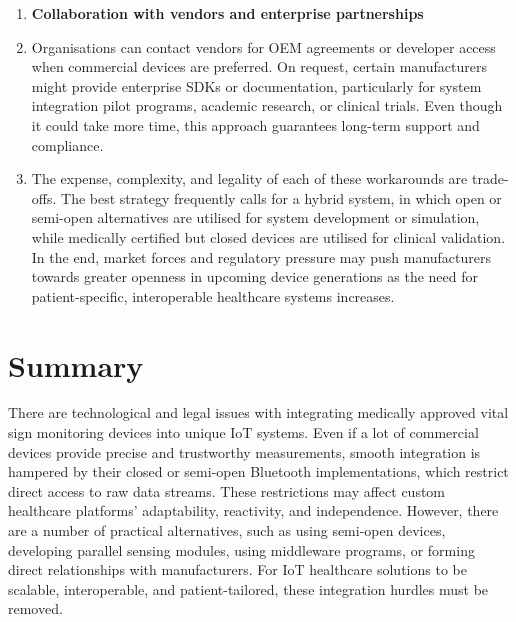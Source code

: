 \begin{enumerate}
	\item \textbf{Collaboration with vendors and enterprise partnerships}
	\item [] Organisations can contact vendors for OEM agreements or developer access when commercial devices are preferred. On request, certain manufacturers might provide enterprise SDKs or documentation, particularly for system integration pilot programs, academic research, or clinical trials. Even though it could take more time, this approach guarantees long-term support and compliance.
	\item[] The expense, complexity, and legality of each of these workarounds are trade-offs. The best strategy frequently calls for a hybrid system, in which open or semi-open alternatives are utilised for system development or simulation, while medically certified but closed devices are utilised for clinical validation. In the end, market forces and regulatory pressure may push manufacturers towards greater openness in upcoming device generations as the need for patient-specific, interoperable healthcare systems increases.
\end{enumerate}

\section{Summary} %
There are technological and legal issues with integrating medically approved vital sign monitoring devices into unique IoT systems. Even if a lot of commercial devices provide precise and trustworthy measurements, smooth integration is hampered by their closed or semi-open Bluetooth implementations, which restrict direct access to raw data streams. These restrictions may affect custom healthcare platforms' adaptability, reactivity, and independence. However, there are a number of practical alternatives, such as using semi-open devices, developing parallel sensing modules, using middleware programs, or forming direct relationships with manufacturers. For IoT healthcare solutions to be scalable, interoperable, and patient-tailored, these integration hurdles must be removed.
